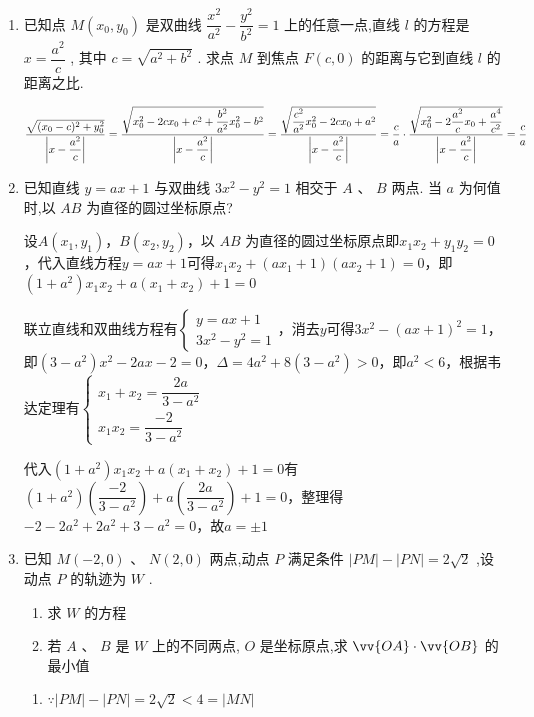 \begin{enumerate}
    \item 已知点 $M\left( {{x}_{0},{y}_{0}}\right)$ 是双曲线 $\dfrac{{x}^{2}}{{a}^{2}} - \dfrac{{y}^{2}}{{b}^{2}} = 1$ 上的任意一点,直线 $l$ 的方程是 $x = \dfrac{{a}^{2}}{c}$ , 其中 $c = \sqrt{{a}^{2} + {b}^{2}}$ . 求点 $M$ 到焦点 $F\left( {c,0}\right)$ 的距离与它到直线 $l$ 的距离之比.
    \begin{jieda}
        $\dfrac{\sqrt{(x_0-c)^2+y_0^2}}{\left|x-\dfrac{a^2}{c}\right|} = \dfrac{\sqrt{x_0^2-2cx_0+c^2 + \dfrac{b^2}{a^2}x_0^2-b^2}}{\left|x-\dfrac{a^2}{c}\right|} = \dfrac{\sqrt{\dfrac{c^2}{a^2}x_0^2-2cx_0+a^2}}{\left|x-\dfrac{a^2}{c}\right|} = \\
        \dfrac{c}{a} \cdot \dfrac{\sqrt{x_0^2 - 2\dfrac{a^2}{c}x_0 + \dfrac{a^4}{c^2}}}{\left|x-\dfrac{a^2}{c}\right|} = \dfrac{c}{a}$
    \end{jieda}

    \item 已知直线 $y = {ax} + 1$ 与双曲线 $3{x}^{2} - {y}^{2} = 1$ 相交于 $A$ 、 $B$ 两点. 当 $a$ 为何值时,以 ${AB}$ 为直径的圆过坐标原点? 
    \begin{jieda}
        设$A(x_1, y_1)$，$B(x_2, y_2)$，以 ${AB}$ 为直径的圆过坐标原点即$x_1x_2+y_1y_2 = 0$，代入直线方程$y = {ax} + 1$可得$x_1x_2+({ax_1} + 1)({ax_2} + 1) = 0$，即$(1+a^2)x_1x_2 + a(x_1+x_2) + 1 = 0$

        联立直线和双曲线方程有$\left\{\begin{array}{l}
             y = {ax} + 1  \\
             3{x}^{2} - {y}^{2} = 1 
        \end{array}\right.$，消去$y$可得$3{x}^{2} - ({ax} + 1)^2 = 1 $，即$(3-a^2)x^2-2ax -2 = 0$，$\Delta = 4a^2+8(3-a^2) > 0$，即$a^2 < 6$，根据韦达定理有$\left\{\begin{array}{l}
             x_1+x_2 = \dfrac{2a}{3-a^2} \\
             x_1x_2 = \dfrac{-2}{3-a^2}
        \end{array}\right.$
        
        代入$(1+a^2)x_1x_2 + a(x_1+x_2) + 1 = 0$有$(1+a^2)\left(\dfrac{-2}{3-a^2}\right) + a\left(\dfrac{2a}{3-a^2}\right) + 1 = 0$，整理得$-2-2a^2+2a^2+3-a^2 = 0$，故$a = \pm 1$
    \end{jieda}
    \item 已知 $M\left( {-2,0}\right) \text{ 、 }N\left( {2,0}\right)$ 两点,动点 $P$ 满足条件 $\left| {PM}\right|  - \left| {PN}\right|  = 2\sqrt{2}$ ,设动点 $P$ 的轨迹为 $W$ . 
    \begin{enumerate}
        \item 求 $W$ 的方程
        \item 若 $A$ 、 $B$ 是 $W$ 上的不同两点, $O$ 是坐标原点,求 $\vv{OA} \cdot  \vv{OB}$ 的最小值
    \end{enumerate}
    \begin{jieda}
        \begin{enumerate}
            \item $\because \left| {PM}\right|  - \left| {PN}\right|  = 2\sqrt{2} < 4 = \left| {MN}\right|$
            

\end{enumerate}
\end{jieda}
\end{enumerate}
